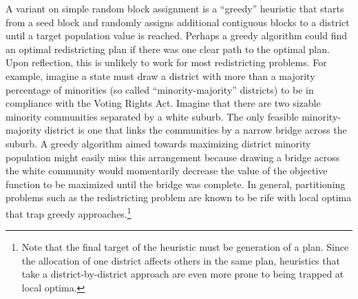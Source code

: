\documentclass[article]{JSSstyle/jss}
\begin{document}
A variant on simple random block assignment is a ``greedy'' 
heuristic that starts from a seed block and randomly assigns 
additional contiguous blocks to a district until a target population 
value is reached. Perhaps a greedy algorithm could find an optimal redistricting plan 
if there was one clear path to the optimal plan.  Upon reflection, this is unlikely to  
 work for most redistricting problems.  For example, imagine a state must draw a district 
with more than a majority percentage of minorities 
(so called ``minority-majority'' districts) to be in 
compliance with the Voting Rights Act.  Imagine that there are two 
sizable minority communities separated by a white 
suburb.  The only feasible minority-majority district is one that 
links the communities by a narrow bridge across the suburb.  A 
greedy algorithm aimed towards maximizing district minority 
population might easily miss this arrangement because  
drawing a bridge across the white community would momentarily decrease the value of the objective
function to be maximized until the bridge was complete. In general, partitioning problems such as the redistricting problem are known to be rife with local optima that trap greedy approaches.\footnote{Note that the final target of the heuristic must be generation of a plan. Since the allocation of one district affects others in the same plan, heuristics that take a district-by-district approach are even more prone to being trapped at local optima. }


\end{document}
